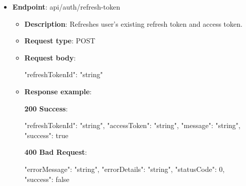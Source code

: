 \begin{itemize}
\begin{itemize}
        \begin{spverbatim}
        {
            "errorMessage": "string",
            "errorDetails": "string",
            "statusCode": 0,
            "success": false
        }
        \end{spverbatim}

        \textbf{409 Conflict}:

        \begin{spverbatim}
        {
            "errorMessage": "string",
            "errorDetails": "string",
            "statusCode": 0,
            "success": false
        }
        \end{spverbatim}
        \item \textbf{Response messages}:
        \begin{enumerate}
            \item Success.
            \item Invalid credentials.
        \end{enumerate}
    \end{itemize}


    \item \textbf{Endpoint}: api/auth/refresh-token
    \begin{itemize}
        \item \textbf{Description}: Refreshes user's existing refresh token and access token.
        \item \textbf{Request type}: POST
        \item \textbf{Request body}:
        \begin{spverbatim}
        {
            "refreshTokenId": "string"
        }
        \end{spverbatim}
        \item  \textbf{Response example}:

        \textbf{200 Success}:

        \begin{spverbatim}
        {
            "refreshTokenId": "string",
            "accessToken": "string",
            "message": "string",
            "success": true
        }
        \end{spverbatim}

        \textbf{400 Bad Request}:

        \begin{spverbatim}
        {
            "errorMessage": "string",
            "errorDetails": "string",
            "statusCode": 0,
            "success": false
        }
        \end{spverbatim}


\end{itemize}
\end{itemize}
